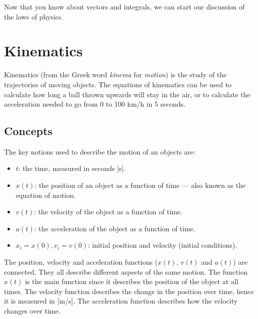 \documentclass[letterpaper,9pt,journal]{IEEEtran}
\begin{document}
Now that you know about vectors and integrals, 
we can start our discussion of the laws of physics.


\section{Kinematics}
\label{sec:kinematics}

Kinematics (from the Greek word \emph{kinema} for \emph{motion}) is the study of the
trajectories of moving objects.  
The equations of kinematics can be used to calculate how long a ball thrown upwards will stay in the air, 
or to calculate the acceleration needed to go from 0 to 100 km/h in 5 seconds.

\vspace{-3mm}
\subsection{Concepts}
\label{408d82ccb63ca28fa1665f5ee146b453}%

The key notions used to describe the motion of an objects are:
\begin{itemize}
\item  $t$: the time, measured in seconds [s].
\item  $x(t)$: the position of an object as a function of time --- also known as the equation of motion. %
\item  $v(t)$: the velocity of the object as a function of time.%
\item  $a(t)$: the acceleration of the object as a function of time. %
\item  $x_i=x(0), v_i=v(0)$: initial position and velocity (initial conditions).
\end{itemize}

The position, velocity and acceleration functions ($x(t)$, $v(t)$ and $a(t)$) are connected. 
They all describe different aspects of the same motion.
The function $x(t)$ is the main function since it describes the position of the object at all times.
The velocity function describes the change in the position over time, hence it is measured in [m/s].
The acceleration function describes how the velocity changes over time.
\end{document}
